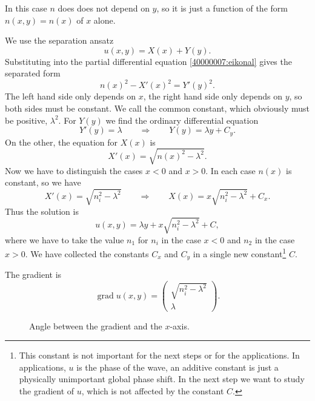 \begin{loesung}
In this case $n$ does does not depend on $y$, so it is just a function
of the form $n(x,y)=n(x)$ of $x$ alone.
\begin{teilaufgaben}
\item
We use the separation ansatz
\[
u(x,y)=X(x) + Y(y).
\]
Substituting into the partial differential equation
\eqref{40000007:eikonal} gives the separated form
\[
n(x)^2-X'(x)^2=Y'(y)^2.
\]
The left hand side only depends on $x$, the right hand side only depends
on $y$, so both sides must be constant.
We call the common constant, which obviously must be positive, 
$\lambda^2$.
For 
$Y(y)$
we find the ordinary differential equation
\[
Y'(y)=\lambda \qquad\Rightarrow\qquad Y(y)=\lambda y+ C_y.
\]
On the other, the equation for $X(x)$ is
\[
X'(x)=\sqrt{n(x)^2-\lambda^2}.
\]
Now we have to distinguish the cases $x<0$ and $x>0$.
In each case $n(x)$ is constant, so we have
\[
X'(x)=\sqrt{n_i^2-\lambda^2}
\qquad
\Rightarrow
\qquad
X(x)=x\sqrt{n_i^2-\lambda^2} + C_x.
\]
Thus the solution is
\[
u(x,y)=\lambda y + x\sqrt{n_i^2-\lambda^2} + C,
\]
where we have to take the value $n_1$ for $n_i$ in the case $x<0$
and $n_2$ in the case $x>0$.
We have collected the constants
$C_x$ and $C_y$ in a single new constant\footnote{This constant
is not important for the next steps or for the applications.
In applications, $u$ is the phase of the wave, an additive constant
is just a physically unimportant global phase shift.
In the next step we want to study the gradient of $u$, which is not
affected by the constant $C$.}
$C$.
\item
The gradient is
\[
\operatorname{grad}u(x,y)
=
\begin{pmatrix}
\sqrt{n_i^2-\lambda^2}\\
\lambda
\end{pmatrix}.
\]
\begin{figure}
\centering
{}
\caption{Angle between the gradient and the $x$-axis.
}
\end{figure}
\end{teilaufgaben}
\end{loesung}
